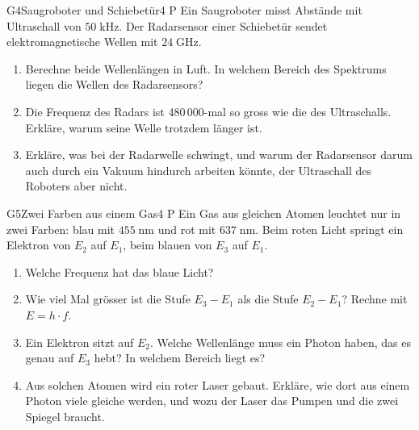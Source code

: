 \documentclass[11pt]{article}
\begin{document}
\begin{lpaufgabe}{G4}{Saugroboter und Schiebetür}{4 P}
Ein Saugroboter misst Abstände mit Ultraschall von \(50\;\text{kHz}\). Der Radarsensor einer Schiebetür sendet elektromagnetische Wellen mit \(24\;\text{GHz}\).
\begin{enumerate}[label=\alph*),leftmargin=*,itemsep=2pt,topsep=2pt]
\item Berechne beide Wellenlängen in Luft. In welchem Bereich des Spektrums liegen die Wellen des Radarsensors?
\item Die Frequenz des Radars ist 480\,000-mal so gross wie die des Ultraschalls. Erkläre, warum seine Welle trotzdem länger ist.
\item Erkläre, was bei der Radarwelle schwingt, und warum der Radarsensor darum auch durch ein Vakuum hindurch arbeiten könnte, der Ultraschall des Roboters aber nicht.
\end{enumerate}
\end{lpaufgabe}

\begin{lpaufgabe}{G5}{Zwei Farben aus einem Gas}{4 P}
Ein Gas aus gleichen Atomen leuchtet nur in zwei Farben: blau mit \(455\;\text{nm}\) und rot mit \(637\;\text{nm}\). Beim roten Licht springt ein Elektron von \(E_2\) auf \(E_1\), beim blauen von \(E_3\) auf \(E_1\).
\begin{enumerate}[label=\alph*),leftmargin=*,itemsep=2pt,topsep=2pt]
\item Welche Frequenz hat das blaue Licht?
\item Wie viel Mal grösser ist die Stufe \(E_3 - E_1\) als die Stufe \(E_2 - E_1\)? Rechne mit \(E = h \cdot f\).
\item Ein Elektron sitzt auf \(E_2\). Welche Wellenlänge muss ein Photon haben, das es genau auf \(E_3\) hebt? In welchem Bereich liegt es?
\item Aus solchen Atomen wird ein roter Laser gebaut. Erkläre, wie dort aus einem Photon viele gleiche werden, und wozu der Laser das Pumpen und die zwei Spiegel braucht.
\end{enumerate}
\end{lpaufgabe}

\end{document}
